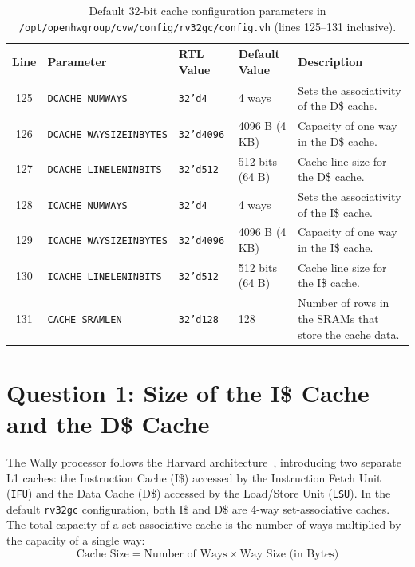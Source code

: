 \documentclass[11pt,a4paper]{article}
\begin{document}
\begin{table}[H]
\centering
\small
\renewcommand{\arraystretch}{1.34}
\begin{tabularx}{\textwidth}{@{}c l l l >{\raggedright\arraybackslash}X@{}}
\toprule
\textbf{Line} & \textbf{Parameter} & \textbf{RTL Value} & \textbf{Default Value} & \textbf{Description} \\
\midrule
125 & \texttt{DCACHE\_NUMWAYS} & \texttt{32'd4} & 4 ways & Sets the associativity of the D\$ cache. \\
126 & \texttt{DCACHE\_WAYSIZEINBYTES} & \texttt{32'd4096} & 4096 B (4 KB) & Capacity of one way in the D\$ cache. \\
127 & \texttt{DCACHE\_LINELENINBITS} & \texttt{32'd512} & 512 bits (64 B) & Cache line size for the D\$ cache. \\
128 & \texttt{ICACHE\_NUMWAYS} & \texttt{32'd4} & 4 ways & Sets the associativity of the I\$ cache. \\
129 & \texttt{ICACHE\_WAYSIZEINBYTES} & \texttt{32'd4096} & 4096 B (4 KB) & Capacity of one way in the I\$ cache. \\
130 & \texttt{ICACHE\_LINELENINBITS} & \texttt{32'd512} & 512 bits (64 B) & Cache line size for the I\$ cache. \\
131 & \texttt{CACHE\_SRAMLEN} & \texttt{32'd128} & 128 & Number of rows in the SRAMs that store the cache data. \\
\bottomrule
\end{tabularx}
\caption{Default 32-bit cache configuration parameters in \texttt{/opt/openhwgroup/cvw/config/rv32gc/config.vh} (lines 125--131 inclusive).}
\label{tab:default_params}
\end{table}


\section{Question 1: Size of the I\$ Cache and the D\$ Cache}

The Wally processor follows the Harvard architecture~\cite{wiki_harvard}, introducing two separate L1 caches: the Instruction Cache (I\$) accessed by the Instruction Fetch Unit (\texttt{IFU}) and the Data Cache (D\$) accessed by the Load/Store Unit (\texttt{LSU}). In the default \texttt{rv32gc} configuration, both I\$ and D\$ are 4-way set-associative caches. The total capacity of a set-associative cache is the number of ways multiplied by the capacity of a single way:
\[
\text{Cache Size} = \text{Number of Ways} \times \text{Way Size (in Bytes)}
\]
\end{document}
